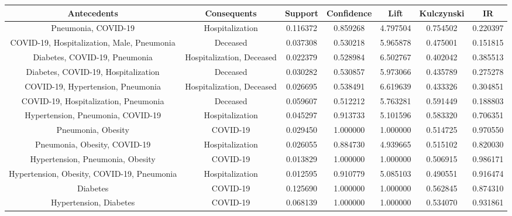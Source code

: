 \documentclass[11pt,a4paper]{article}
\begin{document}
\begin{center}
\hspace*{-2.4cm}
\scriptsize
\begin{tabular}{ | c | c | c | c | c | c | c | }
    \rowcolor{gray!50}
    \hline
    Antecedents & Consequents & Support & Confidence & Lift & Kulczynski & IR\\
    \hline
    Pneumonia, COVID-19 & Hospitalization & 0.116372 & 0.859268 & 4.797504 & 0.754502 & 0.220397\\
    \hline
    COVID-19, Hospitalization, Male, Pneumonia & Deceased & 0.037308 & 0.530218 & 5.965878 & 0.475001 & 0.151815\\
    \hline
    Diabetes, COVID-19, Pneumonia & Hospitalization, Deceased & 0.022379 & 0.528984 & 6.502767 & 0.402042 & 0.385513\\
    \hline
    Diabetes, COVID-19, Hospitalization & Deceased & 0.030282 & 0.530857 & 5.973066 & 0.435789 & 0.275278\\
    \hline
    COVID-19, Hypertension, Pneumonia & Hospitalization, Deceased & 0.026695 & 0.538491 & 6.619639 & 0.433326 & 0.304851\\
    \hline
    COVID-19, Hospitalization, Pneumonia & Deceased & 0.059607 & 0.512212 & 5.763281 & 0.591449 & 0.188803\\
    \hline
    Hypertension, Pneumonia, COVID-19 & Hospitalization & 0.045297 & 0.913733 & 5.101596 & {\color{red}0.583320} & {\color{red}0.706351}\\
    \hline
    Pneumonia, Obesity & COVID-19 & 0.029450 & 1.000000 & 1.000000 & {\color{red}0.514725} & {\color{red}0.970550}\\
    \hline
    Pneumonia, Obesity, COVID-19 & Hospitalization & 0.026055 & 0.884730 & 4.939665 & {\color{red}0.515102} & {\color{red}0.820030}\\
    \hline
    Hypertension, Pneumonia, Obesity & COVID-19 & 0.013829 & 1.000000 & 1.000000 & {\color{red}0.506915} & {\color{red}0.986171}\\
    \hline
    Hypertension, Obesity, COVID-19, Pneumonia & Hospitalization & 0.012595 & 0.910779 & 5.085103 & {\color{red}0.490551} & {\color{red}0.916474}\\
    \hline
    Diabetes & COVID-19 & 0.125690 & 1.000000 & 1.000000 & {\color{red}0.562845} & {\color{red}0.874310}\\
    \hline
    Hypertension, Diabetes & COVID-19 & 0.068139 & 1.000000 & 1.000000 & {\color{red}0.534070} & {\color{red}0.931861}\\

\end{tabular}
\end{center}
\end{document}
